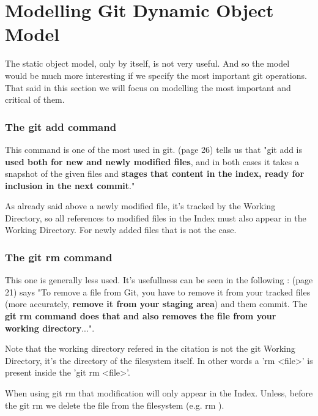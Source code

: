 \section {Modelling Git Dynamic Object Model}

The static object model, only by itself, 
is not very useful. And so
the model would be much more interesting if we specify 
the most important git operations. That said in this
section we will focus on modelling the most important
and critical of them. \par


\subsubsection{The git add command}

This command is one of the most used in git. \cite{gitComm} (page 26)
tells us that
"git add is {\bf used both for new and newly modified files},
and in both cases it takes a snapshot of the given files
and {\bf stages that content in the index, ready for inclusion
in the next commit}." \par 
As already said above a newly modified file, it's tracked by
the Working Directory, so all references to modified files in
the Index must also appear in the Working Directory. For newly
added files that is not the case.

\subsubsection{The git rm command}

This one is generally less used. It's usefullness can be
seen in the following : \cite{progit}
(page 21) says "To remove a file from Git, you have to remove it
from your tracked files (more accurately, {\bf remove it from your
staging area}) and them commit. The {\bf git rm command does that
and also removes the file from your working directory}...". \par
Note that the working directory refered in the citation is not
the git Working Directory, it's the directory of the filesystem itself.
In other words a 'rm <file>' is present inside the 'git rm <file>'. \par
When using git rm
that modification will only appear in the Index. Unless, before
the git rm we delete the file from the filesystem (e.g. rm ). \par

